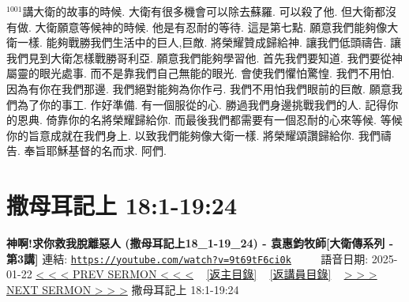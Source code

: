 \documentclass{book}
\begin{document}
$^{1001}$講大衛的故事的時候.
大衛有很多機會可以除去蘇羅.
可以殺了他.
但大衛都沒有做.
大衛願意等候神的時候.
他是有忍耐的等待.
這是第七點.
願意我們能夠像大衛一樣.
能夠戰勝我們生活中的巨人,巨敵.
將榮耀贊成歸給神.
讓我們低頭禱告.
讓我們見到大衛怎樣戰勝哥利亞.
願意我們能夠學習他.
首先我們要知道.
我們要從神屬靈的眼光處事.
而不是靠我們自己無能的眼光.
會使我們懼怕驚惶.
我們不用怕.
因為有你在我們那邊.
我們絕對能夠為你作弓.
我們不用怕我們眼前的巨敵.
願意我們為了你的事工.
作好準備.
有一個服從的心.
勝過我們身邊挑戰我們的人.
記得你的恩典.
倚靠你的名將榮耀歸給你.
而最後我們都需要有一個忍耐的心來等候.
等候你的旨意成就在我們身上.
以致我們能夠像大衛一樣.
將榮耀頌讚歸給你.
我們禱告.
奉旨耶穌基督的名而求.
阿們.
\newpage



\section{撒母耳記上 18:1-19:24}
\label{sec:9t69tF6ci0k}
\textbf{神啊!求你救我脫離惡人 (撒母耳記上18\_1-19\_24) - 袁惠鈞牧師[大衛傳系列 - 第3講]}
\newline
\newline
連結: \href{https://youtube.com/watch?v=9t69tF6ci0k}{\texttt{https://youtube.com/watch?v=9t69tF6ci0k}} ~~~~ 語音日期: 2025-01-22
\newline
\newline
\hyperref[sec:OtTM_EdQEtA]{< < < PREV SERMON < < <}
~
\hyperlink{toc}{[返主目錄]}
~
\hyperref[ch:preacher11]{[返講員目錄]}
~
\hyperref[sec:rN0dS2BBBmc]{> > > NEXT SERMON > > >}
\newline
\newline
撒母耳記上 18:1-19:24
\newline
\end{document}
